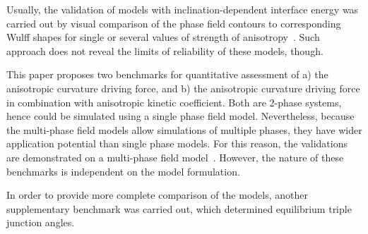 Usually, the validation of models with inclination-dependent interface energy was carried out by visual comparison of the phase field contours to corresponding Wulff shapes for single or several values of strength of anisotropy~\cite{Garcke1999,Eggleston2001,Fleck2011,Ma2006,Tschukin2017}. Such approach does not reveal the limits of reliability of these models, though.

This paper proposes two benchmarks for quantitative assessment of a) the anisotropic curvature driving force, and b) the anisotropic curvature driving force in combination with anisotropic kinetic coefficient. Both are 2-phase systems, hence could be simulated using a single phase field model. Nevertheless, because the multi-phase field models allow simulations of multiple phases, they have wider application potential than single phase models. For this reason, the validations are demonstrated on a multi-phase field model~\cite{Moelans2008}. However, the nature of these benchmarks is independent on the model formulation. 

In order to provide more complete comparison of the models, another supplementary benchmark was carried out, which determined equilibrium triple junction angles.


